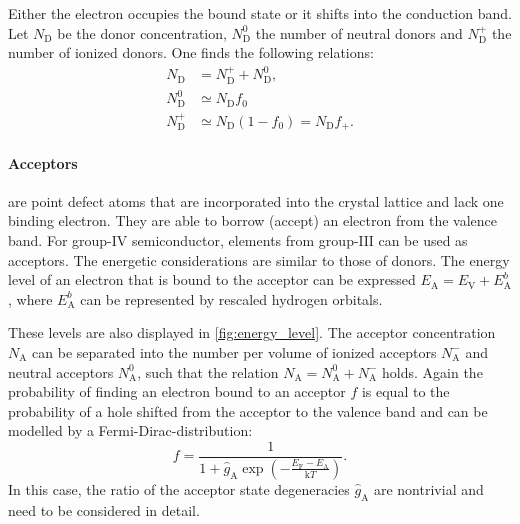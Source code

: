 Either the electron occupies the bound state or it shifts into the
conduction band.
Let $N_\mathrm{D}$ be the donor concentration, $N_\mathrm{D}^0$ the
number of neutral donors and $N_\mathrm{D}^+$ the number of ionized donors.
One finds the following relations:
\begin{align}
	N_{\mathrm{D}}     & =N_{\mathrm{D}}^{+}+N_{\mathrm{D}}^{0},        \\
	N_{\mathrm{D}}^{0} & \simeq N_{\mathrm{D}}f_0                             \\
	\label{eq:ndplus}
	N_{\mathrm{D}}^{+} & \simeq N_{\mathrm{D}}(1-f_{0}) =N_{\mathrm{D}}f_{+}.
\end{align}

\paragraph{Acceptors} are point defect atoms that are incorporated
into the crystal
lattice and lack one binding electron.
They are able to borrow (accept) an electron from the valence band.
For group-$\mathrm{IV}$ semiconductor, elements from group-$\mathrm{III}$
can be used as acceptors.
The energetic considerations are similar to those of donors.
The energy level of an electron that is bound to the acceptor can be
expressed
$E_{\mathrm{A}}=E_{\mathrm{V}}+E_{\mathrm{A}}^{b}$,
where $E_\mathrm{A}^b$ can be represented by rescaled
hydrogen orbitals.

These levels are also displayed in \cref{fig:energy_level}.
The acceptor concentration $N_\mathrm{A}$ can be separated into
the number per volume of ionized acceptors $N_\mathrm{A}^-$ and neutral
acceptors $N_\mathrm{A}^0$, such that the relation
$N_{\mathrm{A}}=N_{\mathrm{A}}^{0}+N_{\mathrm{A}}^{-}$ holds.
Again the probability of finding an electron bound to an acceptor $f$ is
equal to the probability of a hole shifted from the acceptor to the
valence band and can be modelled by a Fermi-Dirac-distribution:
\begin{equation}
	f = \frac{1}{1+\hat{g}_{\mathrm{A}}\exp\left( -
	\frac{E_{\mathrm{F}}-E_{\mathrm{A}}}{\mathrm{k}T} \right)}.
\end{equation}
In this case, the ratio of the acceptor state degeneracies
$\hat{g}_\mathrm{A}$ are nontrivial and need to be considered in detail.

